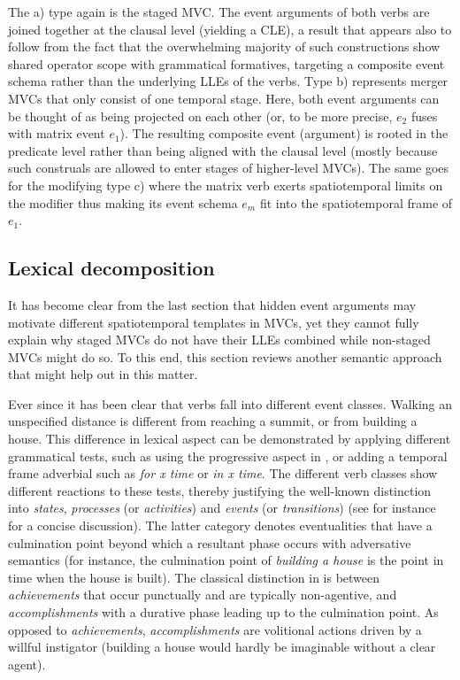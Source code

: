 The a) type again is the staged MVC. The event arguments of both verbs are joined together at the clausal level (yielding a CLE), a result that appears also to follow from the fact that the overwhelming majority of such constructions show shared operator scope with grammatical formatives, targeting a composite event schema rather than the underlying LLEs of the verbs. Type b) represents merger MVCs that only consist of one temporal stage. Here, both event arguments can be thought of as being projected on each other (or, to be more precise, $e_2$ fuses with matrix event $e_1$). The resulting composite event (argument) is rooted in the predicate level rather than being aligned with the clausal level (mostly because such construals are allowed to enter stages of higher-level MVCs). The same goes for the modifying type c) where the matrix verb exerts spatiotemporal limits on the modifier thus making its event schema $e_m$ fit into the spatiotemporal frame of $e_1$.

\subsection{Lexical decomposition} \label{sec:decomposition}

It has become clear from the last section that hidden event arguments may motivate different spatiotemporal templates in MVCs, yet they cannot fully explain why staged MVCs do not have their LLEs combined while non-staged MVCs might do so. To this end, this section reviews another semantic approach that might help out in this matter.

Ever since \citet{vendler1957verbs} it has been clear that verbs fall into different event classes. Walking an unspecified distance is different from reaching a summit, or from building a house. This difference in lexical aspect can be demonstrated by applying different grammatical tests, such as using the progressive aspect in , or adding a temporal frame adverbial such as \textit{for x time} or \textit{in x time}. The different verb classes show different reactions to these tests, thereby justifying the well-known distinction into \textit{states}, \textit{processes} (or \textit{activities}) and \textit{events} (or \textit{transitions}) (see for instance \citealt{pustejovsky1991syntax} for a concise discussion). The latter category denotes eventualities that have a culmination point beyond which a resultant phase occurs with adversative semantics (for instance, the culmination point of \textit{building a house} is the point in time when the house is built). The classical distinction in \citet{vendler1957verbs} is between \textit{achievements} that occur punctually and are typically non-agentive, and \textit{accomplishments} with a durative phase leading up to the culmination point. As opposed to \textit{achievements}, \textit{accomplishments} are volitional actions driven by a willful instigator (building a house would hardly be imaginable without a clear agent).

